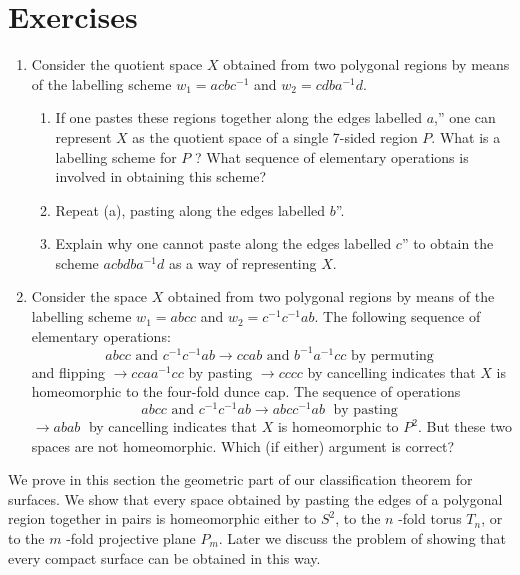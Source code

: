 \section*{Exercises}
\begin{enumerate}[itemsep=0.4em, parsep=0pt, topsep=0pt, partopsep=0pt, leftmargin=*, label=\arabic*., ref=\arabic*]
\item Consider the quotient space \(X\) obtained from two polygonal regions by means of the labelling scheme \(w_{1} = {acb}c^{-1}\) and \(w_{2} = {cdb}a^{-1}d\).
 \begin{enumerate}[itemsep=0.2em, parsep=0pt, topsep=0pt, partopsep=0pt, leftmargin=*, label=(\alph*), align=left]
 \item If one pastes these regions together along the edges labelled \(a\),'' one can represent \(X\) as the quotient space of a single 7-sided region \(P\). What is a labelling scheme for \(P\) ? What sequence of elementary operations is involved in obtaining this scheme?
 \item Repeat (a), pasting along the edges labelled \(b\)''.
 \item Explain why one cannot paste along the edges labelled \(c\)'' to obtain the scheme \({acbdb}a^{-1}d\) as a way of representing \(X\).
 \end{enumerate}
\item Consider the space \(X\) obtained from two polygonal regions by means of the labelling scheme \(w_{1} = {abcc}\) and \(w_{2} = c^{-1}c^{-1}{ab}\). The following sequence of elementary operations: \[ {abcc}\text{ and }c^{-1}c^{-1}{ab} \rightarrow {ccab}\text{ and }b^{-1}a^{-1}{cc}\text{ by permuting } \] and flipping \(\rightarrow {cca}a^{-1}{cc}\) by pasting \(\rightarrow {cccc}\) by cancelling indicates that \(X\) is homeomorphic to the four-fold dunce cap. The sequence of operations \[ {abcc}\text{ and }c^{-1}c^{-1}{ab} \rightarrow {abc}c^{-1}{ab}\;\text{ by pasting } \] \(\rightarrow {abab}\;\) by cancelling indicates that \(X\) is homeomorphic to \(P^{2}\). But these two spaces are not homeomorphic. Which (if either) argument is correct?
\end{enumerate}

We prove in this section the geometric part of our classification theorem for surfaces. We show that every space obtained by pasting the edges of a polygonal region together in pairs is homeomorphic either to \(S^{2}\), to the \(n\) -fold torus \(T_{n}\), or to the \(m\) -fold projective plane \(P_{m}\). Later we discuss the problem of showing that every compact surface can be obtained in this way.

